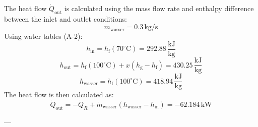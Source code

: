 The heat flow \( \dot{Q}_{\text{out}} \) is calculated using the mass flow rate and enthalpy difference between the inlet and outlet conditions:  
\[
\dot{m}_{\text{wasser}} = 0.3 \, \text{kg/s}
\]  
Using water tables (A-2):  
\[
h_{\text{in}} = h_{\text{f}}(70^\circ\text{C}) = 292.88 \, \frac{\text{kJ}}{\text{kg}}
\]  
\[
h_{\text{out}} = h_{\text{f}}(100^\circ\text{C}) + x(h_{\text{g}} - h_{\text{f}}) = 430.25 \, \frac{\text{kJ}}{\text{kg}}
\]  
\[
h_{\text{wasser}} = h_{\text{f}}(100^\circ\text{C}) = 418.94 \, \frac{\text{kJ}}{\text{kg}}
\]  
The heat flow is then calculated as:  
\[
\dot{Q}_{\text{out}} = -\dot{Q}_R + \dot{m}_{\text{wasser}}(h_{\text{wasser}} - h_{\text{in}}) = -62.184 \, \text{kW}
\]  

---
